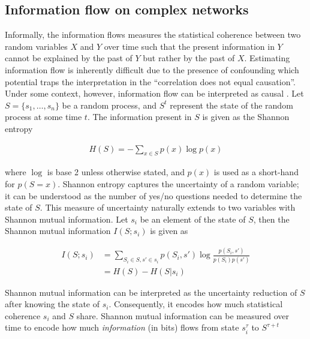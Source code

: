\documentclass[a4paper, 11pt, twocolumn]{article}
\begin{document}
\subsection{Information flow on complex networks}
\label{sec:org3d3e541}
Informally, the information flows measures the statistical coherence
between two random variables \(X\) and \(Y\) over time such that the
present information in \(Y\) cannot be explained by the past of \(Y\)
but rather by the past of \(X\). Estimating information flow is
inherently difficult due to the presence of confounding which potential
traps the interpretation in the ``correlation does not equal causation''.
Under some context, however, information flow can be interpreted as
causal \cite{vanElteren2022}. Let \(S=\{s_1, \dots, s_n\}\) be a random
process, and \(S^t\) represent the state of the random process at some
time \(t\). The information present in \(S\) is given as the Shannon
entropy

\begin{equation}
\label{eq:entropy}
\begin{split}
H(S) = -\sum_{x \in S} p(x) \log p(x)
\end{split}
\end{equation}


where \(\log\) is base 2 unless otherwise stated, and \(p(x)\) is used
as a short-hand for \(p(S  = x)\). Shannon entropy captures the
uncertainty of a random variable; it can be understood as the number of
yes/no questions needed to determine the state of \(S\). This measure of
uncertainty naturally extends to two variables with Shannon mutual
information. Let \(s_i\) be an element of the state of \(S\), then the
Shannon mutual information \(I(S; s_i)\) is given as

\begin{equation}
\label{eq:mi}
\begin{split}
I(S; s_i) &= \sum_{S_i\in S, s' \in s_i} p(S_i,s') \log \frac{p(S_i,s')}{p(S_i)p(s')}\\
          &= H(S) - H(S | s_i)
\end{split}
\end{equation}


Shannon mutual information can be interpreted as the uncertainty
reduction of \(S\) after knowing the state of \(s_i\). Consequently, it
encodes how much statistical coherence \(s_i\) and \(S\) share. Shannon
mutual information can be measured over time to encode how much
\emph{information}  (in bits)  flows  from  state \(s_i^{\tau}\)  to
\(S^{\tau + t}\)
\end{document}
